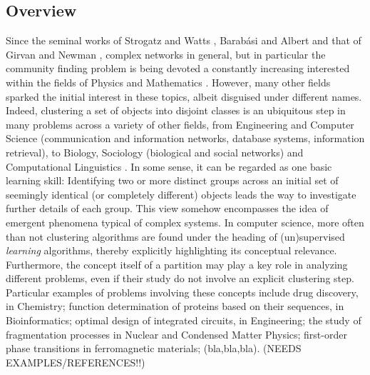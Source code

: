 \documentclass[twocolumn,aps,sort,nofootinbib]{revtex4}
\begin{document}
\subsection{Overview}
Since the seminal works of Strogatz and Watts \cite{Strogatz98},
Barab\'asi and Albert \cite{Barabasi99} and that of 
Girvan and Newman \cite{Girvan02}, complex networks in general,
but in particular
the community finding problem is being devoted 
a constantly increasing interested within the
fields of Physics and Mathematics \cite{Fortunato10,Evans10,Porter09}.
However, many other fields sparked the
initial interest in these topics, albeit disguised under
different names.  
Indeed, clustering a set of objects into disjoint classes is
an ubiquitous step in many problems across a variety
of other fields, from Engineering and Computer Science
(communication and information networks, database systems, 
information retrieval), to Biology, Sociology 
(biological and social networks)
and
Computational Linguistics
\cite{Schaeffer07,Griffiths86,ICTIR2009,Justo05,Clark01}. 
In some
sense, it can be regarded as one basic learning
skill: Identifying two or more distinct groups across  
an initial set of seemingly identical 
(or completely different) 
objects leads
the way to investigate further details of each group.
This view somehow encompasses the idea of emergent phenomena
typical of complex systems.
In computer science, more often than not clustering algorithms
are found under the heading of (un)supervised \textit{learning} 
algorithms, thereby explicitly highlighting its conceptual relevance. 
Furthermore, the concept itself of 
a partition may play a key role in analyzing different
problems, even if their study do not involve an	 
explicit clustering step. Particular examples of problems
involving these concepts include drug discovery, in
Chemistry; function determination of proteins
based on their sequences, in Bioinformatics; optimal design of
integrated circuits, in Engineering; the study of 
fragmentation processes in Nuclear and Condensed Matter Physics; 
first-order phase transitions in ferromagnetic materials; (bla,bla,bla).
(NEEDS EXAMPLES/REFERENCES!!)
\end{document}
